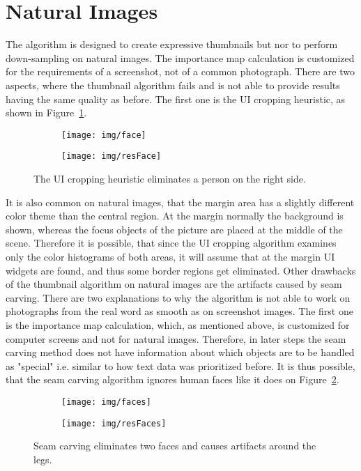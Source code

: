 \documentclass[draft,final]{vutinfth} %
\begin{document}
	\section{Natural Images}
	The algorithm is designed to create expressive thumbnails but nor to perform down-sampling on natural images.
	The importance map calculation is customized for the requirements of a screenshot, not of a common photograph.
	There are two aspects, where the thumbnail algorithm fails and is not able to provide results having the same quality as before.
	The first one is the UI cropping heuristic, as shown in Figure~\ref{fig:nat:face}.
	\begin{figure}[H]
		\centering
		\begin{subfigure}[b]{0.45\columnwidth}
			\centering
			\texttt{[image: img/face]}
		\end{subfigure}
		\begin{subfigure}[b]{0.45\columnwidth}
			\centering
			\texttt{[image: img/resFace]}
		\end{subfigure}
		\caption{The UI cropping heuristic eliminates a person on the right side.}
		\label{fig:nat:face}
	\end{figure}  
	It is also common on natural images, that the margin area has a slightly different color theme than the central region.
	At the margin normally the background is shown, whereas the focus objects of the picture are placed at the middle of the scene.
	Therefore it is possible, that since the UI cropping algorithm examines only the color histograms of both areas, it will assume that at the margin UI widgets are found, and thus some border regions get eliminated.
	Other drawbacks of the thumbnail algorithm on natural images are the artifacts caused by seam carving.
	There are two explanations to why the algorithm is not able to work on photographs from the real word as smooth as on screenshot images.
	The first one is the importance map calculation, which, as mentioned above, is customized for computer screens and not for natural images.
	Therefore,  in later steps the seam carving method does not have information about which objects are to be handled as "special" i.e. similar to how text data was prioritized before.
	It is thus possible, that the seam carving algorithm ignores human faces like it does on Figure~\ref{fig:nat:faces}.	
	\begin{figure}[H]
		\centering
		\begin{subfigure}[b]{0.45\columnwidth}
			\centering
			\texttt{[image: img/faces]}
		\end{subfigure}
		\begin{subfigure}[b]{0.45\columnwidth}
			\centering
			\texttt{[image: img/resFaces]}
		\end{subfigure}
		\caption{Seam carving eliminates two faces and causes artifacts around the legs.}
		\label{fig:nat:faces}
	\end{figure}  
\end{document}
